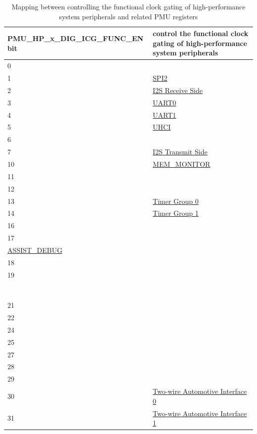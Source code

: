 \documentclass[main\_\_EN.tex]{subfiles}
\begin{document}
\begin{table}[H]
    \centering
    \caption{Mapping between controlling the functional clock gating of high-performance system peripherals and related PMU registers}\label{tab:clk_pmu_func}
\begin{tabular}{|l|l|}
\hline
\rowcolor{lightgray}
PMU\_HP\_x\_DIG\_ICG\_FUNC\_EN bit & control the functional clock gating of high-performance system peripherals \\ \hline
0   & \nameref{mod:dma}\\ \hline
1   & \hyperref[mod:spi]{SPI2}\\ \hline
2   & \hyperref[mod:i2s]{I2S Receive Side}\\ \hline
3   & \hyperref[mod:uart]{UART0}\\ \hline
4   & \hyperref[mod:uart]{UART1}\\ \hline
5   & \hyperref[mod:uart]{UHCI}\\ \hline
6   & \nameref{mod:usbserialjtag}\\ \hline
7   & \hyperref[mod:i2s]{I2S Transmit Side}\\ \hline
10  & \hyperref[mod:dbgassist]{MEM\_MONITOR}\\ \hline
11  & \nameref{mod:sdioslave}\\ \hline
12  & \nameref{mod:tmpsen}\\ \hline
13  & \hyperref[mod:timg]{Timer Group 0}\\ \hline
14  & \hyperref[mod:timg]{Timer Group 1}\\ \hline
16  & \nameref{mod:evntaskmatrix}\\ \hline
17  & \makecell[l]{\nameref{mod:riscvcpu}\\\hyperref[mod:dbgassist]{ASSIST\_DEBUG}}\\ \hline
18  & \nameref{mod:systimer}\\ \hline
19  & \makecell[l]{\nameref{mod:aes}\\\nameref{mod:sha}\\\nameref{mod:rsa}\\\nameref{mod:ecc}\\\nameref{mod:digsig}\\\nameref{mod:hmac}\\\nameref{mod:ecdsa}\\\nameref{mod:keymng}} \\ \hline
21  & \nameref{mod:rmt}\\ \hline
22  & \nameref{mod:mcpwm}\\ \hline
24  & \nameref{mod:bitscrm}\\ \hline
25  & \nameref{mod:parlio} \\ \hline
27  & \nameref{mod:ledpwm}   \\ \hline
28  & \nameref{mod:iomuxgpio}   \\ \hline
29  & \nameref{mod:i2c}   \\ \hline
30  & \hyperref[mod:twai]{Two-wire Automotive Interface 0} \\ \hline
31  & \hyperref[mod:twai]{Two-wire Automotive Interface 1} \\ \hline
\end{tabular}
\end{table}
\end{document}
